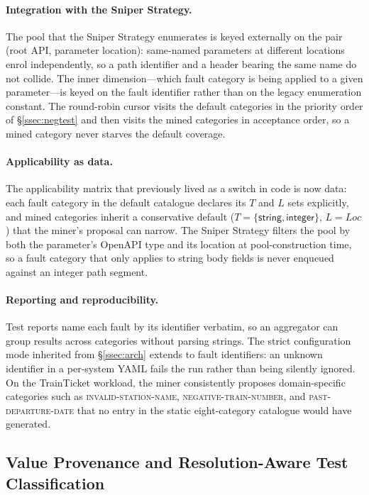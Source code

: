 \documentclass[conference]{IEEEtran}
\begin{document}
\paragraph{Integration with the Sniper Strategy.}
The pool that the Sniper Strategy enumerates is keyed externally on the pair (root API, parameter location): same-named parameters at different locations enrol independently, so a path identifier and a header bearing the same name do not collide. The inner dimension---which fault category is being applied to a given parameter---is keyed on the fault identifier rather than on the legacy enumeration constant. The round-robin cursor visits the default categories in the priority order of \S\ref{ssec:negtest} and then visits the mined categories in acceptance order, so a mined category never starves the default coverage.

\paragraph{Applicability as data.}
The applicability matrix that previously lived as a switch in code is now data: each fault category in the default catalogue declares its $T$ and $L$ sets explicitly, and mined categories inherit a conservative default ($T = \{\textsf{string}, \textsf{integer}\}$, $L = \mathit{Loc}$) that the miner's proposal can narrow. The Sniper Strategy filters the pool by both the parameter's OpenAPI type and its location at pool-construction time, so a fault category that only applies to string body fields is never enqueued against an integer path segment.

\paragraph{Reporting and reproducibility.}
Test reports name each fault by its identifier verbatim, so an aggregator can group results across categories without parsing strings. The strict configuration mode inherited from \S\ref{ssec:arch} extends to fault identifiers: an unknown identifier in a per-system YAML fails the run rather than being silently ignored. On the TrainTicket workload, the miner consistently proposes domain-specific categories such as \textsc{invalid-station-name}, \textsc{negative-train-number}, and \textsc{past-departure-date} that no entry in the static eight-category catalogue would have generated.

\subsection{Value Provenance and Resolution-Aware Test Classification}
\label{ssec:provenance}
\end{document}
